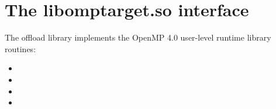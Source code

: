 \section{The libomptarget.so interface}
The offload library implements the OpenMP 4.0 user-level runtime library routines:
\begin{itemize}
  \item {}

  \item {}

  \item {}

  \item {}
\end{itemize}

